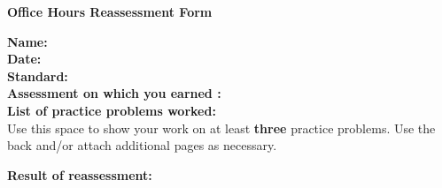 
\usepackage{tbil-la}

\usepackage[top=1in,bottom=1in,left=1in,right=1in]{geometry}
\usepackage{enumerate,hyperref}
\pagestyle{empty}






\begin{center}
{\Large \bf Office Hours Reassessment Form} \\
\large \course
\end{center}



\vspace{0.2in}

\begin{flushleft}
{\bf Name: } \underline{\phantom{xxxxxxxxxxxxxxxxxxxxxxxxxxxxxxxxxxxxxxxxxxxxxxxxxxxxxxxxx}} \\
\vspace{0.15in}
{\bf Date: } \underline{\phantom{xxxxxxxxxxxxxxxxxxxxxxxxxxxxxxxxxxxxxxxxxxxxxxxxxxxxxxxxx}} \\
\vspace{0.15in}
{\bf Standard: } \underline{\phantom{xxxxxxxxxxxxxxxxxxx}} \\
\vspace{0.15in}
{\bf Assessment on which you earned : } \underline{\phantom{xxxxxxxxxxxxxxxxxxxxxxxxxxxxx}} \\
\vspace{0.15in}
{\bf List of practice problems worked: } \\
\vspace{0.4in}
Use this space to show your work on at least {\bf three} practice problems.  Use the back and/or attach additional pages as necessary.

\vfill

\vspace{0.15in}
{\bf Result of reassessment: } \underline{\phantom{xxxxxxxxxxxxxxxxxxxxxxx}} \\

\end{flushleft}


